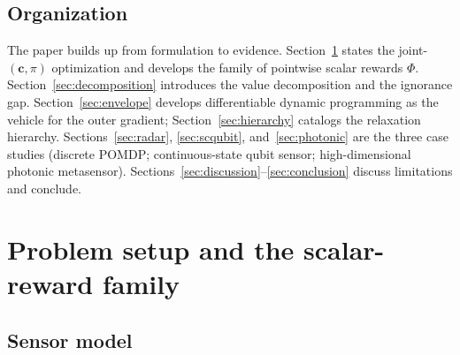 \documentclass[11pt,a4paper,onecolumn]{article}
\newcommand{\bc}{\bm{c}}
\begin{document}
\subsection{Organization}

The paper builds up from formulation to evidence.  Section~\ref{sec:setup} states the joint-$(\bc, \pi)$ optimization and develops the family of pointwise scalar rewards $\Phi$.  Section~\ref{sec:decomposition} introduces the value decomposition and the ignorance gap.  Section~\ref{sec:envelope} develops differentiable dynamic programming as the vehicle for the outer gradient; Section~\ref{sec:hierarchy} catalogs the relaxation hierarchy.  Sections~\ref{sec:radar}, \ref{sec:scqubit}, and~\ref{sec:photonic} are the three case studies (discrete POMDP; continuous-state qubit sensor; high-dimensional photonic metasensor).  Sections~\ref{sec:discussion}--\ref{sec:conclusion} discuss limitations and conclude.

\section{Problem setup and the scalar-reward family}
\label{sec:setup}

\subsection{Sensor model}
\end{document}
